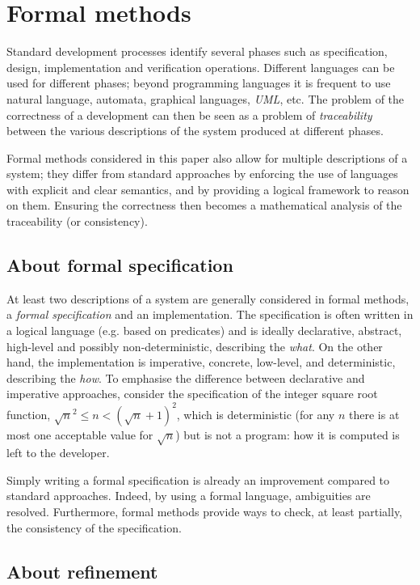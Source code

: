 \documentclass[conference]{IEEEtran}
\begin{document}
\section{Formal methods}\label{formal_methods}

Standard development processes identify several phases such as specification, design,
implementation and verification operations. Different languages can be used for different
phases; beyond programming languages it is frequent to use natural language, automata,
graphical languages, \emph{UML}, etc. The problem of the correctness of a development can then
be seen as a problem of \emph{traceability} between the various descriptions of the system
produced at different phases.

Formal methods considered in this paper also allow for multiple descriptions of a system;
they differ from standard approaches by enforcing the use of languages with explicit and clear
semantics, and by providing a logical framework to reason on them. Ensuring the correctness
then becomes a mathematical analysis of the traceability (or consistency).

\subsection{About formal specification}\label{formal_spec}

At least two descriptions of a system are generally considered in formal methods, a
\emph{formal specification} and an implementation. The specification is often written in a
logical language (e.g. based on predicates) and is ideally declarative, abstract, high-level
and possibly non-deterministic, describing the \emph{what}. On the other hand, the
implementation is imperative, concrete, low-level, and deterministic, describing the
\emph{how}. To emphasise the difference between declarative and imperative approaches,
consider the specification of the integer square root function,
{\small$\sqrt{n}^2\!\leq\!n\!<\!(\sqrt{n}\!+\!1)^2$}, which is deterministic (for any
{\small$n$} there is at most one acceptable value for {\small$\sqrt{n}$}) but is not a
program: how it is computed is left to the developer.

Simply writing a formal specification is already an improvement compared to standard
approaches. Indeed, by using a formal language, ambiguities are resolved. Furthermore, formal
methods provide ways to check, at least partially, the consistency of the specification.

\subsection{About refinement}\label{refinement}
\end{document}
